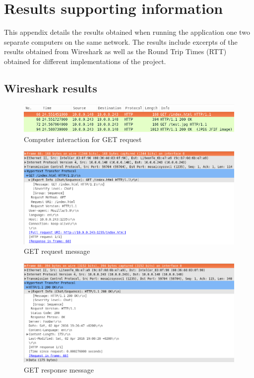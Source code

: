 \documentclass[10pt,twocolumn]{witseiepaper}
\begin{document}
\onecolumn
\clearpage
\newpage
\appendix
\section{Results supporting information} %
\label{sec:results}
	
	This appendix details the results obtained when running the application one two separate computers on the same network. The results include excerpts of the results obtained from Wireshark as well as the Round Trip Times (RTT) obtained for different implementations of the project.

	\subsection{Wireshark results} %
	\label{sub:wireshark_results}
	
		\begin{figure}[h!]
			\centering
			\includegraphics[width=\columnwidth]{resources/get_html}
			\caption{Computer interaction for GET request}
			\label{fig:basic_get}
		\end{figure}
		
		\begin{figure}[h!]
			\centering
			\includegraphics[width=\columnwidth]{resources/message_get_html}
			\caption{GET request message}
			\label{fig:basic_get_message}
		\end{figure}
		
		\begin{figure}[h!]
			\centering
			\includegraphics[width=\columnwidth]{resources/message_get_response_html}
			\caption{GET response message}
			\label{fig:basic_get_response}
		\end{figure}
		
\end{document}
